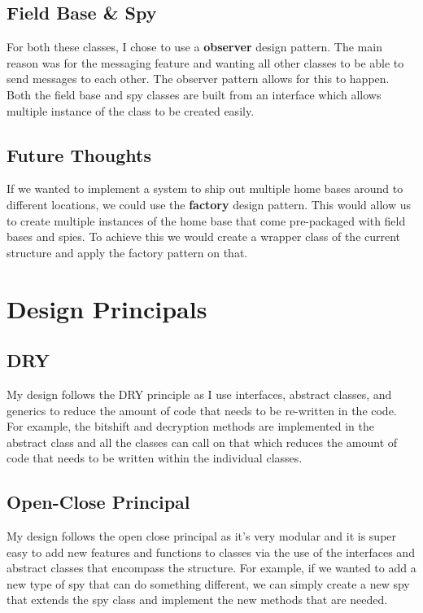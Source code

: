 \documentclass[12pt]{article}
\begin{document}
        \subsection*{Field Base \& Spy}
            For both these classes, I chose to use a \textbf{observer} design pattern. The main reason was for the messaging feature
            and wanting all other classes to be able to send messages to each other. The observer pattern allows
            for this to happen. Both the field base and spy classes are built from an interface which allows multiple instance
            of the class to be created easily. 

        \subsection*{Future Thoughts}
            If we wanted to implement a system to ship out multiple home bases around to different locations, we 
            could use the \textbf{factory} design pattern. This would allow us to create multiple 
            instances of the home base that come pre-packaged with field bases and spies. To achieve
            this we would create a wrapper class of the current structure and apply the factory pattern on that. 
    \section*{Design Principals}
        \subsection*{DRY}
            My design follows the DRY principle as I use interfaces, abstract classes, and generics to reduce 
            the amount of code that needs to be re-written in the code. For example, the 
            bitshift and decryption methods are implemented in the abstract class and all the classes
            can call on that which reduces the amount of code that needs to be written within the individual classes. 
        \subsection*{Open-Close Principal}
            My design follows the open close principal as it's very modular and it is super easy to add new features 
            and functions to classes via the use of the interfaces and abstract classes that encompass the structure. 
            For example, if we wanted to add a new type of spy that can do something different, we can simply create a 
            new spy that extends the spy class and implement the new methods that are needed.
\end{document}
